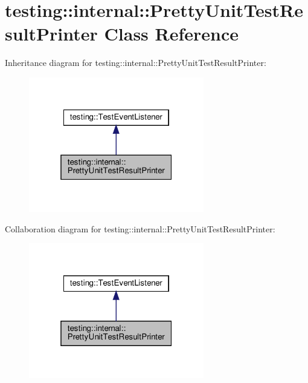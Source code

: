 \hypertarget{classtesting_1_1internal_1_1_pretty_unit_test_result_printer}{}\section{testing\+:\+:internal\+:\+:Pretty\+Unit\+Test\+Result\+Printer Class Reference}
\label{classtesting_1_1internal_1_1_pretty_unit_test_result_printer}


Inheritance diagram for testing\+:\+:internal\+:\+:Pretty\+Unit\+Test\+Result\+Printer\+:
\nopagebreak
\begin{figure}[H]
\begin{center}
\leavevmode
\includegraphics[width=217pt]{classtesting_1_1internal_1_1_pretty_unit_test_result_printer__inherit__graph}
\end{center}
\end{figure}


Collaboration diagram for testing\+:\+:internal\+:\+:Pretty\+Unit\+Test\+Result\+Printer\+:
\nopagebreak
\begin{figure}[H]
\begin{center}
\leavevmode
\includegraphics[width=217pt]{classtesting_1_1internal_1_1_pretty_unit_test_result_printer__coll__graph}
\end{center}
\end{figure}
